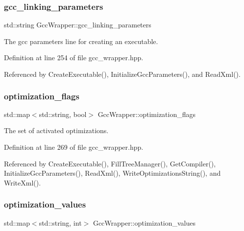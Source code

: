 \subsubsection{\texorpdfstring{gcc\+\_\+linking\+\_\+parameters}{gcc\_linking\_parameters}}
{\footnotesize\ttfamily std\+::string Gcc\+Wrapper\+::gcc\+\_\+linking\+\_\+parameters\hspace{0.3cm}{\ttfamily [private]}}



The gcc parameters line for creating an executable. 



Definition at line 254 of file gcc\+\_\+wrapper.\+hpp.



Referenced by Create\+Executable(), Initialize\+Gcc\+Parameters(), and Read\+Xml().

\mbox{\label{classGccWrapper_a15724cca480e7b872a6b69ff095810af}} 
\subsubsection{\texorpdfstring{optimization\+\_\+flags}{optimization\_flags}}
{\footnotesize\ttfamily std\+::map$<$std\+::string, bool$>$ Gcc\+Wrapper\+::optimization\+\_\+flags\hspace{0.3cm}{\ttfamily [private]}}



The set of activated optimizations. 



Definition at line 269 of file gcc\+\_\+wrapper.\+hpp.



Referenced by Create\+Executable(), Fill\+Tree\+Manager(), Get\+Compiler(), Initialize\+Gcc\+Parameters(), Read\+Xml(), Write\+Optimizations\+String(), and Write\+Xml().

\mbox{\label{classGccWrapper_a24765bcab5d2b4128453ed922fe38a44}} 
\subsubsection{\texorpdfstring{optimization\+\_\+values}{optimization\_values}}
{\footnotesize\ttfamily std\+::map$<$std\+::string, int$>$ Gcc\+Wrapper\+::optimization\+\_\+values\hspace{0.3cm}{\ttfamily [private]}}



